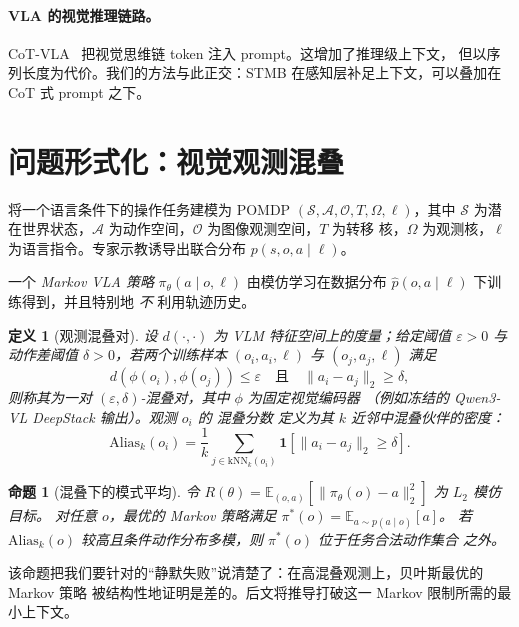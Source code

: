 \documentclass[11pt]{ctexart}
\newtheorem{definition}{定义}
\newtheorem{proposition}{命题}
\begin{document}
\paragraph{VLA 的视觉推理链路。}
CoT-VLA~\cite{zhao2025cotvla} 把视觉思维链 token 注入 prompt。这增加了推理级上下文，
但以序列长度为代价。我们的方法与此正交：STMB 在感知层补足上下文，可以叠加在
CoT 式 prompt 之下。

\section{问题形式化：视觉观测混叠}
\label{sec:problem}

将一个语言条件下的操作任务建模为 POMDP
$(\mathcal{S}, \mathcal{A}, \mathcal{O}, T, \Omega, \ell)$，其中 $\mathcal{S}$
为潜在世界状态，$\mathcal{A}$ 为动作空间，$\mathcal{O}$ 为图像观测空间，$T$ 为转移
核，$\Omega$ 为观测核，$\ell$ 为语言指令。专家示教诱导出联合分布
$p(s, o, a \mid \ell)$。

一个 \emph{Markov VLA 策略} $\pi_\theta(a \mid o, \ell)$ 由模仿学习在数据分布
$\widehat{p}(o, a \mid \ell)$ 下训练得到，并且特别地 \emph{不} 利用轨迹历史。

\begin{definition}[观测混叠对]
\label{def:alias}
设 $d(\cdot,\cdot)$ 为 VLM 特征空间上的度量；给定阈值 $\varepsilon > 0$
与动作差阈值 $\delta > 0$，若两个训练样本 $(o_i, a_i, \ell)$ 与 $(o_j, a_j, \ell)$
满足
\[
d(\phi(o_i), \phi(o_j)) \le \varepsilon \quad \text{且} \quad
\|a_i - a_j\|_2 \ge \delta,
\]
则称其为一对 \emph{$(\varepsilon, \delta)$-混叠对}，其中 $\phi$ 为固定视觉编码器
（例如冻结的 Qwen3-VL DeepStack 输出）。观测 $o_i$ 的 \emph{混叠分数} 定义为其
$k$ 近邻中混叠伙伴的密度：
\[
\mathrm{Alias}_k(o_i) = \frac{1}{k}\sum_{j \in \mathrm{kNN}_k(o_i)}
\mathbf{1}\!\left[\|a_i - a_j\|_2 \ge \delta\right].
\]
\end{definition}

\begin{proposition}[混叠下的模式平均]
\label{prop:modeavg}
令 $R(\theta) = \mathbb{E}_{(o,a)}[\|\pi_\theta(o) - a\|_2^2]$ 为 $L_2$ 模仿目标。
对任意 $o$，最优的 Markov 策略满足 $\pi^*(o) = \mathbb{E}_{a \sim p(a \mid o)}[a]$。
若 $\mathrm{Alias}_k(o)$ 较高且条件动作分布多模，则 $\pi^*(o)$ 位于任务合法动作集合
之外。
\end{proposition}

该命题把我们要针对的“静默失败”说清楚了：在高混叠观测上，贝叶斯最优的 Markov 策略
被结构性地证明是差的。后文将推导打破这一 Markov 限制所需的最小上下文。
\end{document}
